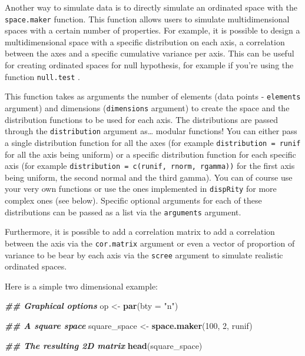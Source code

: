 \documentclass[
]{book}
\newenvironment{Shaded}{\begin{snugshade}}{\end{snugshade}}
\newcommand{\AttributeTok}[1]{\textcolor[rgb]{0.13,0.29,0.53}{#1}}
\newcommand{\DecValTok}[1]{\textcolor[rgb]{0.00,0.00,0.81}{#1}}
\newcommand{\DocumentationTok}[1]{\textcolor[rgb]{0.56,0.35,0.01}{\textbf{\textit{#1}}}}
\newcommand{\FunctionTok}[1]{\textcolor[rgb]{0.13,0.29,0.53}{\textbf{#1}}}
\newcommand{\NormalTok}[1]{#1}
\newcommand{\OtherTok}[1]{\textcolor[rgb]{0.56,0.35,0.01}{#1}}
\newcommand{\StringTok}[1]{\textcolor[rgb]{0.31,0.60,0.02}{#1}}
\begin{document}
Another way to simulate data is to directly simulate an ordinated space with the \texttt{space.maker} function.
This function allows users to simulate multidimensional spaces with a certain number of properties.
For example, it is possible to design a multidimensional space with a specific distribution on each axis, a correlation between the axes and a specific cumulative variance per axis.
This can be useful for creating ordinated spaces for null hypothesis, for example if you're using the function \texttt{null.test} \citep{diaz2016global}.

This function takes as arguments the number of elements (data points - \texttt{elements} argument) and dimensions (\texttt{dimensions} argument) to create the space and the distribution functions to be used for each axis.
The distributions are passed through the \texttt{distribution} argument as\ldots{} modular functions!
You can either pass a single distribution function for all the axes (for example \texttt{distribution\ =\ runif} for all the axis being uniform) or a specific distribution function for each specific axis (for example \texttt{distribution\ =\ c(runif,\ rnorm,\ rgamma))} for the first axis being uniform, the second normal and the third gamma).
You can of course use your very own functions or use the ones implemented in \texttt{dispRity} for more complex ones (see below).
Specific optional arguments for each of these distributions can be passed as a list via the \texttt{arguments} argument.

Furthermore, it is possible to add a correlation matrix to add a correlation between the axis via the \texttt{cor.matrix} argument or even a vector of proportion of variance to be bear by each axis via the \texttt{scree} argument to simulate realistic ordinated spaces.

Here is a simple two dimensional example:

\begin{Shaded}
\begin{Highlighting}[]
\DocumentationTok{\#\# Graphical options}
\NormalTok{op }\OtherTok{\textless{}{-}} \FunctionTok{par}\NormalTok{(}\AttributeTok{bty =} \StringTok{"n"}\NormalTok{)}

\DocumentationTok{\#\# A square space}
\NormalTok{square\_space }\OtherTok{\textless{}{-}} \FunctionTok{space.maker}\NormalTok{(}\DecValTok{100}\NormalTok{, }\DecValTok{2}\NormalTok{, runif)}

\DocumentationTok{\#\# The resulting 2D matrix}
\FunctionTok{head}\NormalTok{(square\_space)}
\end{Highlighting}
\end{Shaded}
\end{document}
